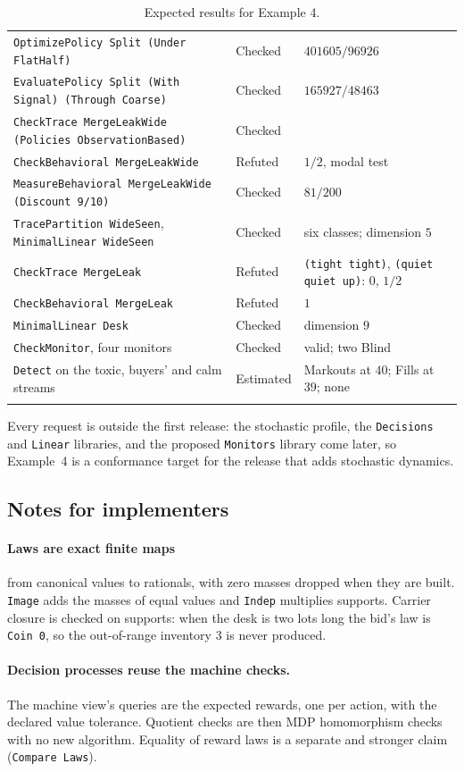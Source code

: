 \documentclass[11pt]{article}
\newcommand{\code}[1]{\texttt{#1}}
\theoremstyle{definition}
\theoremstyle{plain}
\begin{document}
\begin{longtable}{>{\raggedright\arraybackslash}p{6.4cm}l>{\raggedright\arraybackslash}p{5.1cm}}
\code{OptimizePolicy Split (Under FlatHalf)} & Checked & $401605/96926$\\
\code{EvaluatePolicy Split (With Signal) (Through Coarse)} & Checked & $165927/48463$\\
\code{CheckTrace MergeLeakWide (Policies ObservationBased)} & Checked & \\
\code{CheckBehavioral MergeLeakWide} & Refuted & $1/2$, modal test\\
\code{MeasureBehavioral MergeLeakWide (Discount 9/10)} & Checked & $81/200$\\
\code{TracePartition WideSeen}, \code{MinimalLinear WideSeen} & Checked & six classes; dimension $5$\\
\code{CheckTrace MergeLeak} & Refuted & \code{(tight tight)}, \code{(quiet quiet up)}: $0$, $1/2$\\
\code{CheckBehavioral MergeLeak} & Refuted & $1$\\
\code{MinimalLinear Desk} & Checked & dimension $9$\\
\code{CheckMonitor}, four monitors & Checked & valid; two Blind\\
\code{Detect} on the toxic, buyers' and calm streams & Estimated & Markouts at $40$; Fills at $39$; none\\
\bottomrule
\caption{Expected results for Example 4.}\label{tab:ex4results}
\end{longtable}

Every request is outside the first release: the stochastic profile, the \code{Decisions} and \code{Linear}
libraries, and the proposed \code{Monitors} library come later, so Example~4 is a conformance target for
the release that adds stochastic dynamics.

\subsection{Notes for implementers}

\paragraph{Laws are exact finite maps} from canonical values to rationals, with zero masses dropped when
they are built. \code{Image} adds the masses of equal values and \code{Indep} multiplies supports. Carrier
closure is checked on supports: when the desk is two lots long the bid's law is \code{Coin 0}, so the
out-of-range inventory $3$ is never produced.

\paragraph{Decision processes reuse the machine checks.} The machine view's queries are the expected
rewards, one per action, with the declared value tolerance. Quotient checks are then MDP homomorphism
checks with no new algorithm. Equality of reward laws is a separate and stronger claim
(\code{Compare Laws}).
\end{document}
